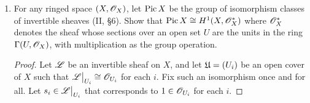 \documentclass{article}
\begin{document}
\begin{enumerate} [label=\textbf{\arabic*.}, leftmargin=0em]
\begin{proof}
\begin{itemize} [leftmargin=0cm]
    \item[(c)]
  \end{itemize}
\end{proof}

\item For any ringed space $(X, \mathscr{O}_X)$, let $\operatorname{Pic}{X}$ be the group of isomorphism classes of invertible sheaves (II, \S 6).
Show that $\operatorname{Pic}{X} \cong H^1(X, \mathscr{O}_X^*)$ where $\mathscr{O}_X^*$ denotes the sheaf whose sections over an open set $U$ are the units in the ring $\Gamma(U, \mathscr{O}_X)$, with multiplication as the group operation.

\begin{proof}
  Let $\mathscr{L}$ be an invertible sheaf on $X$, and let $\mathfrak{U} = (U_i)$ be an open cover of $X$ such that $\restr{\fL}{U_i} \cong \fO_{U_i}$ for each $i$.
  Fix such an isomorphism once and for all.
  Let $s_i \in \restr{\fL}{U_i}$ that corresponds to $1 \in \mathscr{O}_{U_i}$ for each $i$.
\end{proof}

\end{enumerate}
\end{document}
